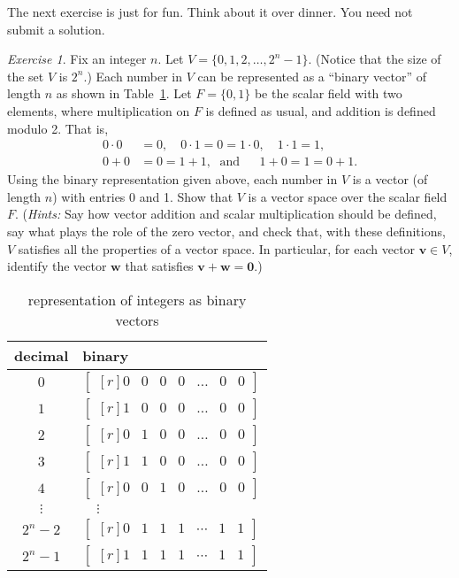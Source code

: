\documentclass[fleqn,11pt]{paper}
\theoremstyle{remark}
\newtheorem*{exercise}{Exercise}
\renewcommand{\vec}[1]{\mathbf{#1}}
\newcommand{\<}{\ensuremath{\langle}}
\renewcommand{\>}{\ensuremath{\rangle}}
\newcommand\vv{\vec{v}}
\newcommand\vw{\vec{w}}
\newcommand\vzero{\vec{0}}
\begin{document}
\newpage
\noindent The next exercise is just for fun. 
Think about it over dinner. You need not submit a solution.
\begin{exercise}
Fix an integer $n$.  Let $V = \{0, 1, 2, \dots, 2^n - 1\}$.  (Notice that the
size of the set $V$ is $2^n$.)  Each number in $V$ can be 
represented as a ``binary vector'' of length $n$ as shown in Table~\ref{tab:1}.
Let $F = \{0,1\}$ be the scalar field with two elements, where multiplication on
$F$ is defined as usual, and addition is defined modulo 2. That is,
\begin{align*}
0\cdot 0 &= 0, \quad 0\cdot 1 =0= 1\cdot 0, \quad 1\cdot 1 = 1,\\
0+0 &= 0 = 1+1, \; \text{ and } \; \quad 1+0=1=0+1.
\end{align*}
Using the binary representation given above, each number
in $V$ is a vector (of length $n$) with entries 0 and 1.
Show that $V$ is a vector space over the scalar field
$F$.  ({\it Hints:} Say how vector addition and scalar
multiplication should be defined, say what plays the role of the zero vector,
and check that, with these definitions, $V$ satisfies all the properties of
a vector space. In particular, for each vector $\vv\in V$, identify the vector
$\vw$ that satisfies $\vv + \vw = \vzero$.)

\begin{table}[h!]
  \begin{center}
\begin{tabular}{c|l}
  decimal & binary\\
  \hline
$0 $    & $\begin{bmatrix*}[r] 0&0&0&0&\dots& 0&0\end{bmatrix*}$\\[2pt]
$1 $    & $\begin{bmatrix*}[r] 1&0&0&0&\dots& 0&0\end{bmatrix*}$\\[2pt]
$2 $    & $\begin{bmatrix*}[r] 0&1&0&0&\dots& 0&0\end{bmatrix*}$\\[2pt]
$3 $    & $\begin{bmatrix*}[r] 1&1&0&0&\dots& 0&0\end{bmatrix*}$\\[2pt]
$4 $    & $\begin{bmatrix*}[r] 0&0&1&0&\dots& 0&0\end{bmatrix*}$\\
$\vdots$        &$\quad \vdots$\\
$2^n-2 $& $\begin{bmatrix*}[r]0&1&1&1&\cdots& 1&1\end{bmatrix*}$\\
$2^n-1 $& $\begin{bmatrix*}[r]1&1&1&1&\cdots&1&1\end{bmatrix*}$
\end{tabular}
  \caption{representation of integers as binary vectors} 
  \label{tab:1}
  \end{center}
\end{table}
\end{exercise}
\end{document}
